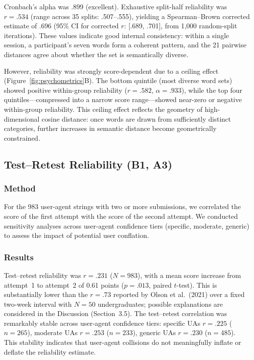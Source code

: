 \documentclass[12pt]{article}
\begin{document}
Cronbach's alpha was .899 (excellent). Exhaustive split-half reliability was $r = .534$ (range across 35 splits: .507--.555), yielding a Spearman--Brown corrected estimate of .696 (95\% CI for corrected $r$: [.689, .701], from 1,000 random-split iterations). These values indicate good internal consistency: within a single session, a participant's seven words form a coherent pattern, and the 21 pairwise distances agree about whether the set is semantically diverse.

However, reliability was strongly score-dependent due to a ceiling effect (Figure~\ref{fig:psychometrics}B). The bottom quintile (most diverse word sets) showed positive within-group reliability ($r = .582$, $\alpha = .933$), while the top four quintiles---compressed into a narrow score range---showed near-zero or negative within-group reliability. This ceiling effect reflects the geometry of high-dimensional cosine distance: once words are drawn from sufficiently distinct categories, further increases in semantic distance become geometrically constrained.

\subsection{Test--Retest Reliability (B1, A3)}

\subsubsection{Method}

For the 983 user-agent strings with two or more submissions, we correlated the score of the first attempt with the score of the second attempt. We conducted sensitivity analyses across user-agent confidence tiers (specific, moderate, generic) to assess the impact of potential user conflation.

\subsubsection{Results}

Test--retest reliability was $r = .231$ ($N = 983$), with a mean score increase from attempt~1 to attempt~2 of 0.61 points ($p = .013$, paired $t$-test). This is substantially lower than the $r = .73$ reported by Olson et al.\ (2021) over a fixed two-week interval with $N = 50$ undergraduates; possible explanations are considered in the Discussion (Section~3.5). The test--retest correlation was remarkably stable across user-agent confidence tiers: specific UAs $r = .225$ ($n = 265$), moderate UAs $r = .253$ ($n = 233$), generic UAs $r = .230$ ($n = 485$). This stability indicates that user-agent collisions do not meaningfully inflate or deflate the reliability estimate.
\end{document}

